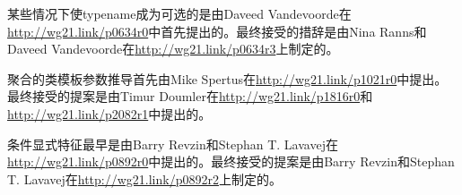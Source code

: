某些情况下使typename成为可选的是由Daveed Vandevoorde在\url{http://wg21.link/p0634r0}中首先提出的。最终接受的措辞是由Nina Ranns和Daveed Vandevoorde在\url{http://wg21.link/p0634r3}上制定的。

聚合的类模板参数推导首先由Mike Spertus在\url{http://wg21.link/p1021r0}中提出。最终接受的提案是由Timur Doumler在\url{http://wg21.link/p1816r0}和\url{http://wg21.link/p2082r1}中提出的。

条件显式特征最早是由Barry Revzin和Stephan T. Lavavej在\url{http://wg21.link/p0892r0}中提出的。最终接受的提案是由Barry Revzin和Stephan T. Lavavej在\url{http://wg21.link/p0892r2}上制定的。